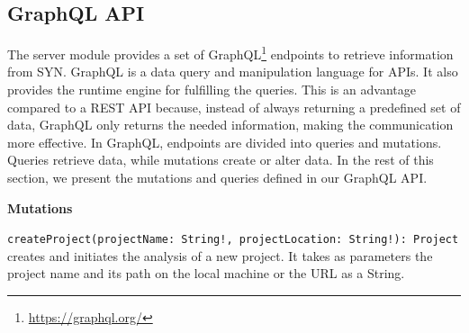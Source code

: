 \subsection*{GraphQL API} 
The server module provides a set of GraphQL\footnote{\url{https://graphql.org/}} endpoints to retrieve information from SYN. 
GraphQL is a data query and manipulation language for APIs. It also provides the runtime engine for fulfilling the queries.
This is an advantage compared to a REST API because, instead of always returning a predefined set of data, GraphQL only returns the needed information, making the communication more effective. 
In GraphQL, endpoints are divided into queries and mutations. Queries retrieve data, while mutations create or alter data. In the rest of this section, we present the mutations and queries defined in our GraphQL API.


\textbf{Mutations}

\bigbreak
\texttt{createProject(projectName: String!, projectLocation: String!): Project} \\
creates and initiates the analysis of a new project.
It takes as parameters the project name and its path on the local machine or the URL as a String. 

